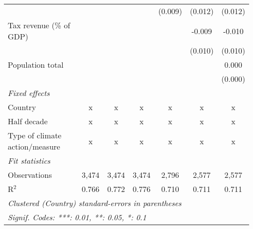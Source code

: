 \begin{tabular}{lcccccc}
                                                             &         &               &               & (0.009)        & (0.012)       & (0.012)\\   
   Tax revenue (\% of GDP)                                   &         &               &               &                & -0.009        & -0.010\\   
                                                             &         &               &               &                & (0.010)       & (0.010)\\   
   Population total                                          &         &               &               &                &               & 0.000\\   
                                                             &         &               &               &                &               & (0.000)\\   
   \emph{Fixed effects}\\
   Country                                                   & x       & x             & x             & x              & x             & x\\  
   Half decade                                               & x       & x             & x             & x              & x             & x\\  
   Type of climate action/measure                            & x       & x             & x             & x              & x             & x\\  
   \midrule \emph{Fit statistics}\\
   Observations                                              & 3,474   & 3,474         & 3,474         & 2,796          & 2,577         & 2,577\\  
   R$^2$                                                     & 0.766   & 0.772         & 0.776         & 0.710          & 0.711         & 0.711\\  
   \midrule
   \multicolumn{7}{l}{\emph{Clustered (Country) standard-errors in parentheses}}\\
   \multicolumn{7}{l}{\emph{Signif. Codes: ***: 0.01, **: 0.05, *: 0.1}}\\
\end{tabular}
\par\endgroup



